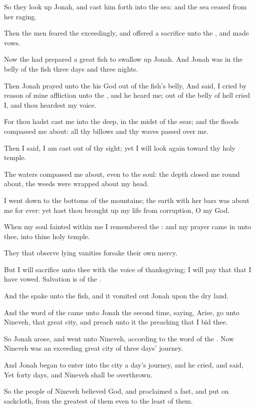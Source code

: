 \Verse So they look up Jonah, and cast him forth into the sea: and the sea ceased from her raging.

\Verse Then the men feared the \LORD exceedingly, and offered a sacrifice unto the \LORD, and made vows.

\Verse Now the \LORD had prepared a great fish to swallow up Jonah. And Jonah was in the belly of the fish three days and three nights.


\Chapter
\Verse Then Jonah prayed unto the \LORD his God out of the fish's belly, \Verse And said, I cried by reason of mine affliction unto the \LORD, and he heard me; out of the belly of hell cried I, and thou heardest my voice.

\Verse For thou hadst cast me into the deep, in the midst of the seas; and the floods compassed me about: all thy billows and thy waves passed over me.

\Verse Then I said, I am cast out of thy sight; yet I will look again toward thy holy temple.

\Verse The waters compassed me about, even to the soul: the depth closed me round about, the weeds were wrapped about my head.

\Verse I went down to the bottoms of the mountains; the earth with her bars was about me for ever: yet hast thou brought up my life from corruption, O \LORD my God.

\Verse When my soul fainted within me I remembered the \LORD: and my prayer came in unto thee, into thine holy temple.

\Verse They that observe lying vanities forsake their own mercy.

\Verse But I will sacrifice unto thee with the voice of thanksgiving; I will pay that that I have vowed. Salvation is of the \LORD.

\Verse And the \LORD spake unto the fish, and it vomited out Jonah upon the dry land.


\Chapter
\Verse And the word of the \LORD came unto Jonah the second time, saying, \Verse Arise, go unto Nineveh, that great city, and preach unto it the preaching that I bid thee.

\Verse So Jonah arose, and went unto Nineveh, according to the word of the \LORD. Now Nineveh was an exceeding great city of three days' journey.

\Verse And Jonah began to enter into the city a day's journey, and he cried, and said, Yet forty days, and Nineveh shall be overthrown.

\Verse So the people of Nineveh believed God, and proclaimed a fast, and put on sackcloth, from the greatest of them even to the least of them.

